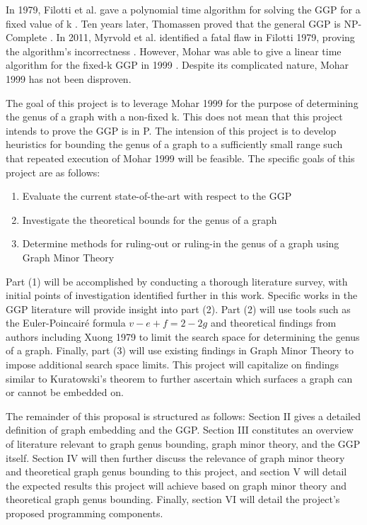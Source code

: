 \documentclass[12pt,conference]{IEEEtran}
\begin{document}
In 1979, Filotti et al. gave a polynomial time algorithm for solving the GGP for a fixed value of k \cite{filotti}. Ten years later, Thomassen proved that the general GGP is NP-Complete \cite{thomassen}. In 2011, Myrvold et al. identified a fatal flaw in Filotti 1979, proving the algorithm's incorrectness \cite{myrvold-kocay}. However, Mohar was able to give a linear time algorithm for the fixed-k GGP in 1999 \cite{mohar}. Despite its complicated nature, Mohar 1999 has not been disproven. 

The goal of this project is to leverage Mohar 1999 for the purpose of determining the genus of a graph with a non-fixed k. This does not mean that this project intends to prove the GGP is in P. The intension of this project is to develop heuristics for bounding the genus of a graph to a sufficiently small range such that repeated execution of Mohar 1999 will be feasible. The specific goals of this project are as follows:

\begin{enumerate}
\item Evaluate the current state-of-the-art with respect to the GGP
\item Investigate the theoretical bounds for the genus of a graph
\item Determine methods for ruling-out or ruling-in the genus of a graph using Graph Minor Theory
\end{enumerate}

Part (1) will be accomplished by conducting a thorough literature survey, with initial points of investigation identified further in this work. Specific works in the GGP literature will provide insight into part (2). Part (2) will use tools such as the Euler-Poincair\'e formula $v-e+f=2-2g$ and theoretical findings from authors including Xuong 1979 \cite{xuong} to limit the search space for determining the genus of a graph. Finally, part (3) will use existing findings in Graph Minor Theory to impose additional search space limits. This project will capitalize on findings similar to Kuratowski's theorem to further ascertain which surfaces a graph can or cannot be embedded on.

The remainder of this proposal is structured as follows: Section II gives a detailed definition of graph embedding and the GGP. Section III constitutes an overview of literature relevant to graph genus bounding, graph minor theory, and the GGP itself. Section IV will then further discuss the relevance of graph minor theory and theoretical graph genus bounding to this project, and section V will detail the expected results this project will achieve based on graph minor theory and theoretical graph genus bounding. Finally, section VI will detail the project's proposed programming components.
\end{document}

